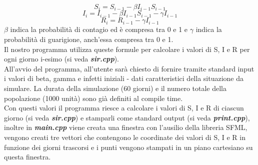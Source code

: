 \documentclass[a4paper,10 pt]{article}
\begin{document}
$$
S_i = S_{i - 1} - \beta I_{i - 1}S_{i - 1} 
$$
$$
I_i = I_{i - 1} - \beta I_{i - 1}S_{i - 1} - \gamma I_{i - 1}
$$
$$
R_i = R_{i - 1} - \gamma I_{i - 1}
$$
$\beta$ indica la probabilità di contagio ed è compresa tra 0 e 1 e $\gamma$ indica la probabilità di guarigione, anch'essa compresa tra 0 e 1.
\ \\
Il nostro programma utilizza queste formule per calcolare i valori di S, I e R per ogni giorno i-esimo (si veda  \textbf{\textit{sir.cpp}}).
\ \\
All'avvio del programma, all'utente sarà chiesto di fornire tramite standard input i valori di beta, gamma e infetti iniziali - dati caratteristici della situazione da simulare. La durata della simulazione (60 giorni) e il numero totale della popolazione (1000 unità) sono già definiti al compile time.
\\ 
Con questi valori il programma riesce a calcolare i valori di S, I e R di ciascun giorno (si veda  \textbf{\textit{sir.cpp}}) e stamparli come standard output (si veda  \textbf{\textit{print.cpp}}), inoltre in \textbf{\textit{main.cpp}} viene creata una finestra con l'ausilio della libreria SFML, vengono creati tre vettori che contengono le coordinate dei valori di S, I e R in funzione dei giorni trascorsi e i punti vengono stampati in un piano cartesiano su questa finestra.
\end{document}
